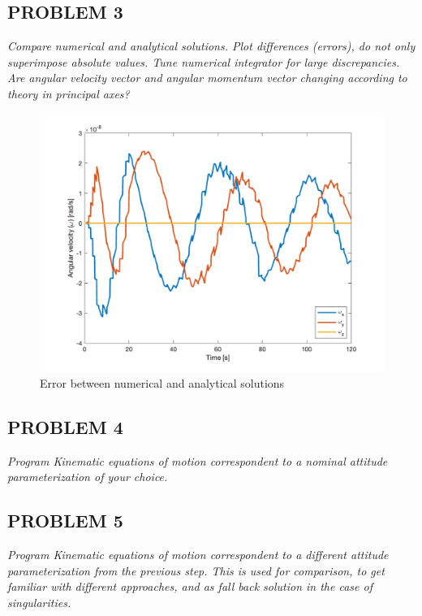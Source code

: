 \subsection{PROBLEM 3}
\textit{Compare numerical and analytical solutions. Plot differences (errors), do not only superimpose absolute values. Tune numerical integrator for large discrepancies. Are angular velocity vector and angular momentum vector changing according to theory in principal axes?}

\begin{figure}[H]
\centering
\includegraphics[scale=0.6]{Images/ps3_problem3.png}
\caption{Error between numerical and analytical solutions}
\label{fig:ps3_problem3}
\end{figure}


\subsection{PROBLEM 4}
\textit{Program Kinematic equations of motion correspondent to a nominal attitude parameterization of your choice.}








\subsection{PROBLEM 5}
\textit{Program Kinematic equations of motion correspondent to a different attitude parameterization from the previous step. This is used for comparison, to get familiar with different approaches, and as fall back solution in the case of singularities.}

